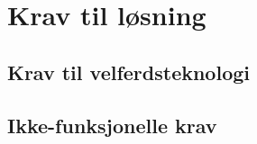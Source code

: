 \chapter{Krav til løsning}
\label{ch:requirements}

\section{Krav til velferdsteknologi}

\section{Ikke-funksjonelle krav}

